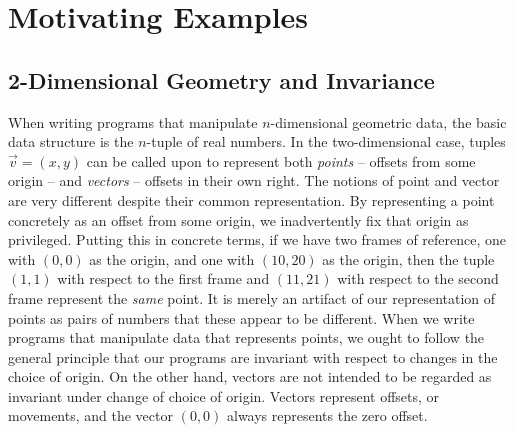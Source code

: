 \section{Motivating Examples}

\subsection{2-Dimensional Geometry and Invariance}

When writing programs that manipulate $n$-dimensional geometric data,
the basic data structure is the $n$-tuple of real numbers. In the
two-dimensional case, tuples $\vec{v} = (x,y)$ can be called upon to
represent both \emph{points} -- offsets from some origin -- and
\emph{vectors} -- offsets in their own right. The notions of point and
vector are very different despite their common representation. By
representing a point concretely as an offset from some origin, we
inadvertently fix that origin as privileged.
Putting this in concrete terms, if we have two frames of reference,
one with $(0,0)$ as the origin, and one with $(10,20)$ as the origin,
then the tuple $(1,1)$ with respect to the first frame and $(11,21)$
with respect to the second frame represent the \emph{same} point. It
is merely an artifact of our representation of points as pairs of
numbers that these appear to be different. When we write programs that
manipulate data that represents points, we ought to follow the general
principle that our programs are invariant with respect to changes in
the choice of origin. On the other hand, vectors are not intended to
be regarded as invariant under change of choice of origin. Vectors
represent offsets, or movements, and the vector $(0,0)$ always
represents the zero offset.


